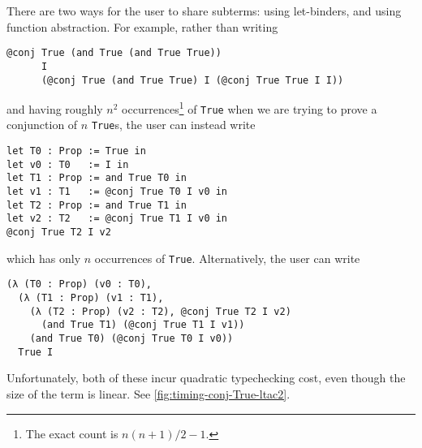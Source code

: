 There are two ways for the user to share subterms: using let-binders, and using function abstraction.
For example, rather than writing
\begin{verbatim}
@conj True (and True (and True True))
      I
      (@conj True (and True True) I (@conj True True I I))
\end{verbatim}
and having roughly $n^2$ occurrences\footnote{The exact count is $n(n+1)/2 - 1$.} of \texttt{True} when we are trying to prove a conjunction of $n$ \texttt{True}s, the user can instead write
\begin{verbatim}
let T0 : Prop := True in
let v0 : T0   := I in
let T1 : Prop := and True T0 in
let v1 : T1   := @conj True T0 I v0 in
let T2 : Prop := and True T1 in
let v2 : T2   := @conj True T1 I v0 in
@conj True T2 I v2
\end{verbatim}
which has only $n$ occurrences of \texttt{True}.
Alternatively, the user can write
\begin{verbatim}
(λ (T0 : Prop) (v0 : T0),
  (λ (T1 : Prop) (v1 : T1),
    (λ (T2 : Prop) (v2 : T2), @conj True T2 I v2)
      (and True T1) (@conj True T1 I v1))
    (and True T0) (@conj True T0 I v0))
  True I
\end{verbatim}

Unfortunately, both of these incur quadratic typechecking cost, even though the size of the term is linear.
See \autoref{fig:timing-conj-True-ltac2}.

